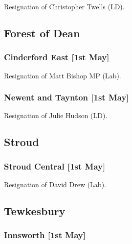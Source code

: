 \documentclass[a4paper,openany]{book}
\begin{document}
\begin{resultsiii}
Resignation of Christopher Twells (LD).

\subsection*{Forest of Dean}

\subsubsection*{Cinderford East \hspace*{\fill}\nolinebreak[1]%
	\enspace\hspace*{\fill}
	[1st May]}


Resignation of Matt Bishop MP (Lab).

\subsubsection*{Newent and Taynton \hspace*{\fill}\nolinebreak[1]%
	\enspace\hspace*{\fill}
	[1st May]}


Resignation of Julie Hudson (LD).

\subsection*{Stroud}

\subsubsection*{Stroud Central \hspace*{\fill}\nolinebreak[1]%
	\enspace\hspace*{\fill}
	[1st May]}


Resignation of David Drew (Lab).

\subsection*{Tewkesbury}

\subsubsection*{Innsworth \hspace*{\fill}\nolinebreak[1]%
	\enspace\hspace*{\fill}
	[1st May]}


\end{resultsiii}
\end{document}
